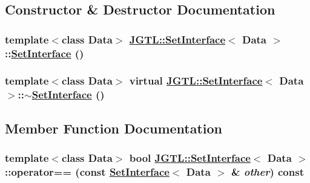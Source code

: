 \subsection{Constructor \& Destructor Documentation}
\hypertarget{class_j_g_t_l_1_1_set_interface_fd2b06e95eef00ac46b778e1c96a13e4}{
\subsubsection[SetInterface]{\setlength{\rightskip}{0pt plus 5cm}template$<$class Data$>$ \hyperlink{class_j_g_t_l_1_1_set_interface}{JGTL::Set\-Interface}$<$ Data $>$::\hyperlink{class_j_g_t_l_1_1_set_interface}{Set\-Interface} ()}}
\label{class_j_g_t_l_1_1_set_interface_fd2b06e95eef00ac46b778e1c96a13e4}


\hypertarget{class_j_g_t_l_1_1_set_interface_bf1ec172c20daa413de2a36764454245}{
\subsubsection[$\sim$SetInterface]{\setlength{\rightskip}{0pt plus 5cm}template$<$class Data$>$ virtual \hyperlink{class_j_g_t_l_1_1_set_interface}{JGTL::Set\-Interface}$<$ Data $>$::$\sim$\hyperlink{class_j_g_t_l_1_1_set_interface}{Set\-Interface} ()}}
\label{class_j_g_t_l_1_1_set_interface_bf1ec172c20daa413de2a36764454245}




\subsection{Member Function Documentation}
\hypertarget{class_j_g_t_l_1_1_set_interface_1c8272ceef57740200d7080b5b5ae2e4}{
\subsubsection[operator==]{\setlength{\rightskip}{0pt plus 5cm}template$<$class Data$>$ bool \hyperlink{class_j_g_t_l_1_1_set_interface}{JGTL::Set\-Interface}$<$ Data $>$::operator== (const \hyperlink{class_j_g_t_l_1_1_set_interface}{Set\-Interface}$<$ Data $>$ \& {\em other}) const}}
\label{class_j_g_t_l_1_1_set_interface_1c8272ceef57740200d7080b5b5ae2e4}


